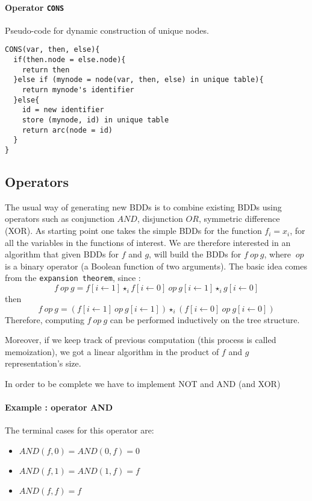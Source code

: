 \documentclass[a4paper,10pt]{article}
\begin{document}
\paragraph{Operator \texttt{CONS}\\}


Pseudo-code for dynamic construction of unique nodes.

\begin{lstlisting}
CONS(var, then, else){
  if(then.node = else.node){
    return then
  }else if (mynode = node(var, then, else) in unique table){
    return mynode's identifier
  }else{
    id = new identifier
    store (mynode, id) in unique table
    return arc(node = id)
  }
}
\end{lstlisting}


\subsection{Operators}

\newcommand{\op}{~op~}

The usual way of generating new BDDs is to combine existing BDDs using operators such as conjunction $AND$, disjunction $OR$, symmetric difference (XOR).
As starting point one takes the simple BDDs for the function $f_i = x_i$, for all the variables in the functions of interest.
We are therefore interested in an algorithm that given BDDs for $f$ and $g$, will build the BDDs for $f\op g$, where $\op$ is a binary operator (a Boolean function of two arguments). The basic idea comes from the \texttt{expansion theorem}, since :
\[f\op g = f[i\leftarrow 1]\star_i f[i\leftarrow 0] \op g[i\leftarrow 1]\star_i g[i\leftarrow 0]\]
then
\[f\op g = (f[i\leftarrow 1]\op g[i\leftarrow 1])\star_i(f[i\leftarrow 0] \op g[i\leftarrow 0])\]
Therefore, computing $f\op g$ can be performed inductively on the tree structure.

Moreover, if we keep track of previous computation (this process is called memoization), we got a linear algorithm in the product of $f$ and $g$ representation's size.

In order to be complete we have to implement NOT and AND (and XOR)

\paragraph{Example : operator AND\\}
The terminal cases for this operator are:\begin{itemize}
\item $AND(f, 0) = AND(0, f) = 0$
\item $AND(f, 1) = AND(1, f) = f$
\item $AND(f, f) = f$
\end{itemize}
\end{document}
